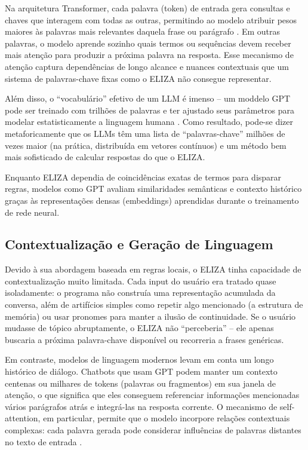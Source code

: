 \documentclass[14pt,a4paper,oneside]{book}
\begin{document}
Na arquitetura Transformer, cada palavra (token) de entrada gera consultas e chaves que interagem com todas as outras, permitindo ao modelo atribuir pesos maiores às palavras mais relevantes daquela frase ou parágrafo \cite{Vaswani2017}. Em outras palavras, o modelo aprende sozinho quais termos ou sequências devem receber mais atenção para produzir a próxima palavra na resposta. Esse mecanismo de atenção captura dependências de longo alcance e nuances contextuais que um sistema de palavras-chave fixas como o ELIZA não consegue representar.

Além disso, o “vocabulário” efetivo de um LLM é imenso – um moddelo GPT pode ser treinado com trilhões de palavras e ter ajustado seus parâmetros para modelar estatisticamente a linguagem humana \cite{Vaswani2017}. Como resultado, pode-se dizer metaforicamente que os LLMs têm uma lista de “palavras-chave” milhões de vezes maior (na prática, distribuída em vetores contínuos) e um método bem mais sofisticado de calcular respostas do que o ELIZA.

Enquanto ELIZA dependia de coincidências exatas de termos para disparar regras, modelos como GPT avaliam similaridades semânticas e contexto histórico graças às representações densas (embeddings) aprendidas durante o treinamento de rede neural.

\subsection{Contextualização e Geração de Linguagem}

Devido à sua abordagem baseada em regras locais, o ELIZA tinha capacidade de contextualização muito limitada. Cada input do usuário era tratado quase isoladamente: o programa não construía uma representação acumulada da conversa, além de artifícios simples como repetir algo mencionado (a estrutura de memória) ou usar pronomes para manter a ilusão de continuidade. Se o usuário mudasse de tópico abruptamente, o ELIZA não “perceberia” – ele apenas buscaria a próxima palavra-chave disponível ou recorreria a frases genéricas.

Em contraste, modelos de linguagem modernos levam em conta um longo histórico de diálogo. Chatbots que usam GPT podem manter um contexto centenas ou milhares de tokens (palavras ou fragmentos) em sua janela de atenção, o que significa que eles conseguem referenciar informações mencionadas vários parágrafos atrás e integrá-las na resposta corrente. O mecanismo de self-attention, em particular, permite que o modelo incorpore relações contextuais complexas: cada palavra gerada pode considerar influências de palavras distantes no texto de entrada \cite{Vaswani2017}.
\end{document}
